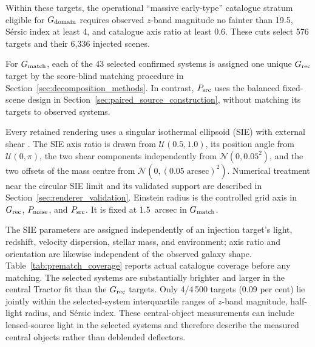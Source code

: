 Within these targets, the operational ``massive early-type'' catalogue
stratum eligible for \(G_{\rm domain}\) requires observed \(z\)-band magnitude
no fainter than 19.5, S\'{e}rsic index at least 4, and catalogue axis ratio at
least 0.6. These cuts select 576 targets and their 6,336 injected scenes.

For \(G_{\rm match}\), each of the 43 selected confirmed systems is assigned
one unique \(G_{\rm rec}\) target by the score-blind matching procedure in
Section~\ref{sec:decomposition_methods}. In contrast, \(P_{\rm src}\) uses
the balanced fixed-scene design in Section~\ref{sec:paired_source_construction},
without matching its targets to observed systems.

Every retained rendering uses a singular isothermal ellipsoid (SIE)
\citep{Kormann1994} with external shear \citep{Keeton2001}. The SIE axis ratio
is drawn from $\mathcal{U}(0.5,1.0)$, its position angle from
$\mathcal{U}(0,\pi)$, the two shear components independently from
$\mathcal{N}(0,0.05^2)$, and the two offsets of the mass centre from
$\mathcal{N}(0,(0.05\;\mathrm{arcsec})^2)$. Numerical treatment near the
circular SIE limit and its validated support are described in
Section~\ref{sec:renderer_validation}.
Einstein radius is the controlled grid axis in \(G_{\rm rec}\),
\(P_{\rm noise}\), and \(P_{\rm src}\). It is fixed at 1.5~arcsec in
\(G_{\rm match}\).

The SIE parameters are assigned independently of an injection target's light,
redshift, velocity dispersion, stellar mass, and environment; axis ratio and
orientation are likewise independent of the observed galaxy shape.
Table~\ref{tab:prematch_coverage} reports actual catalogue
coverage before any matching. The selected systems are substantially brighter
and larger in the central Tractor fit than the \(G_{\rm rec}\) targets. Only
4/4\,500 targets (0.09 per cent) lie jointly within the selected-system
interquartile ranges of \(z\)-band magnitude, half-light radius, and
S\'{e}rsic index. These central-object measurements can include lensed-source
light in the selected systems and therefore describe the measured central
objects rather than deblended deflectors.

